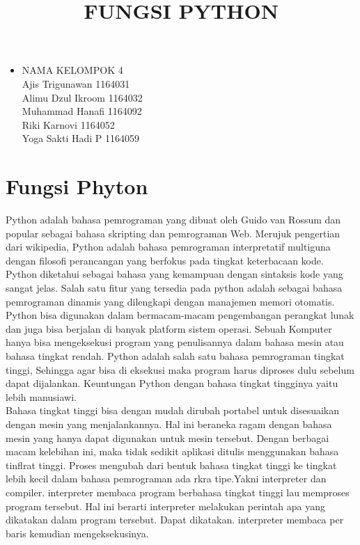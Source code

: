 \documentclass[12pt,a4paper]{article}
\begin{document}
\title{FUNGSI PYTHON}
\maketitle

\begin{itemize}
\item
NAMA KELOMPOK 4\\
Ajis Trigunawan			1164031\\
Alimu Dzul Ikroom		1164032\\
Muhammad Hanafi			1164092\\
Riki Karnovi			1164052\\
Yoga Sakti Hadi P		1164059\\
\end{itemize}

\section{Fungsi Phyton}
Python adalah bahasa pemrograman yang dibuat oleh Guido van Rossum dan popular sebagai bahasa skripting dan pemrograman Web. Merujuk pengertian dari wikipedia, Python adalah bahasa pemrograman interpretatif multiguna dengan filosofi perancangan yang berfokus pada tingkat keterbacaan kode. Python diketahui sebagai bahasa yang kemampuan dengan sintaksis kode yang sangat jelas. Salah satu fitur yang tersedia pada python adalah sebagai bahasa pemrograman dinamis yang dilengkapi dengan manajemen memori otomatis.\\

Python bisa digunakan dalam bermacam-macam pengembangan perangkat lunak dan juga bisa berjalan di banyak platform sistem operasi. Sebuah Komputer hanya bisa mengeksekusi program yang penulisannya dalam bahasa mesin atau bahasa tingkat rendah. Python adalah salah satu bahasa pemrograman tingkat tinggi, Sehingga agar bisa di eksekusi maka program harus diproses dulu sebelum dapat dijalankan. Keuntungan Python dengan bahasa tingkat tingginya yaitu lebih manusiawi.\\

Bahasa tingkat tinggi bisa dengan mudah dirubah portabel untuk disesuaikan dengan mesin yang menjalankannya. Hal ini beraneka ragam dengan bahasa mesin yang hanya dapat digunakan untuk mesin tersebut. Dengan berbagai macam kelebihan ini, maka tidak sedikit aplikasi ditulis menggunakan bahasa tinﬂrat tinggi. Proses mengubah dari bentuk bahasa tingkat tinggi ke tingkat lebih kecil dalam bahasa pemrograman ada rkra tipe.Yakni interpreter dan compiler. interpreter membaca program berbahasa tingkat tinggi lau memproses program tersebut. Hal ini berarti interpreter melakukan perintah apa yang dikatakan dalam program tersebut. Dapat dikatakan. interpreter membaca per baris kemudian mengeksekusinya. \\
\end{document}

